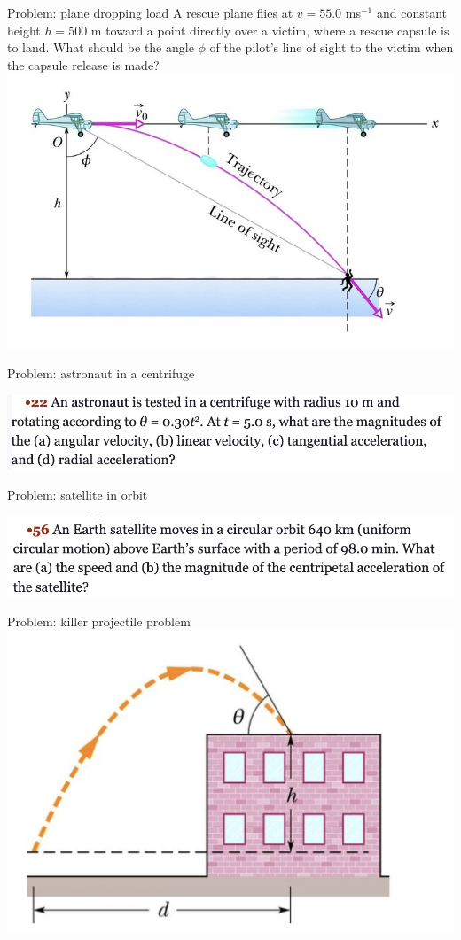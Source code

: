  \begin{frame}{Problem: plane dropping load}
\notsotiny
A rescue plane flies at  $v = 55.0$ ms$^{-1}$ and constant height $h = 500$ m toward a point directly over a victim, where a rescue capsule is to land. What should be the angle $\phi$ of the pilot's line of sight to the victim when the capsule release is made?\\
\includegraphics[scale=0.5]{planeload}
\vspace{8cm}

\end{frame}

\begin{frame}{Problem: astronaut in a centrifuge}

\includegraphics[scale=0.5]{astronaut}

\end{frame}


\begin{frame}{Problem: satellite in orbit}

\includegraphics[scale=0.5]{satellite}

\end{frame}


\begin{frame}{Problem: killer projectile problem}
\includegraphics[scale=0.5]{killer}

\end{frame}
 
